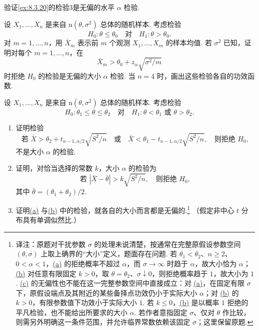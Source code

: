 \begin{exercise}\label{exercise:8.44}
验证\autoref{ex:8.3.20}的检验3是无偏的水平 $\alpha$ 检验.
\end{exercise}
\begin{exercise}\label{exercise:8.45}
设 $X_1,\ldots,X_n$ 是来自 $\mathrm n(\theta,\sigma^2)$ 总体的随机样本. 考虑检验
$$H_0:\theta\le\theta_0\quad\text{对}\quad H_1:\theta>\theta_0.$$
对 $m=1,\ldots,n$，用 $\bar X_m$ 表示前 $m$ 个观测 $X_1,\ldots,X_m$ 的样本均值. 若 $\sigma^2$ 已知，证明对每个 $m=1,\ldots,n$，在
$$\bar X_m>\theta_0+z_\alpha\sqrt{\sigma^2/m}$$
时拒绝 $H_0$ 的检验是无偏的大小 $\alpha$ 检验. 当 $n=4$ 时，画出这些检验各自的功效函数.
\end{exercise}
\begin{exercise}\label{exercise:8.46}
设 $X_1,\ldots,X_n$ 是来自 $\mathrm n(\theta,\sigma^2)$ 总体的随机样本. 考虑检验
$$H_0:\theta_1\le\theta\le\theta_2\quad\text{对}\quad H_1:\theta<\theta_1\text{ 或 }\theta>\theta_2.$$
\begin{enumerate}
\item{}\label{itm:exercise:8.46:a} 证明检验
$$\text{若 }\bar X>\theta_2+t_{n-1,\alpha/2}\sqrt{S^2/n}\quad\text{或}\quad
\bar X<\theta_1-t_{n-1,\alpha/2}\sqrt{S^2/n},\quad\text{则拒绝 }H_0,$$
不是大小 $\alpha$ 的检验.
\item{}\label{itm:exercise:8.46:b} 证明，对恰当选择的常数 $k$，大小 $\alpha$ 的检验为
$$\text{若 }|\bar X-\bar\theta|>k\sqrt{S^2/n},\quad\text{则拒绝 }H_0,$$
其中 $\bar\theta=(\theta_1+\theta_2)/2$.
\item{}\label{itm:exercise:8.46:c} 证明\hyperref[itm:exercise:8.46:a]{(a)} 与\hyperref[itm:exercise:8.46:b]{(b)} 中的检验，就各自的大小而言都是无偏的.\footnote{译注：原题对干扰参数 $\sigma$ 的处理未说清楚，按通常在完整原假设参数空间 $(\theta,\sigma)$ 上取上确界的“大小”定义，题面存在问题. 若 $\theta_1<\theta_2$、$n\ge2$、$0<\alpha<1$，\hyperref[itm:exercise:8.46:a]{(a)} 的拒绝概率不超过 $\alpha$，而 $\sigma\to\infty$ 时趋于 $\alpha$，故大小恰为 $\alpha$；\hyperref[itm:exercise:8.46:b]{(b)} 对任意有限固定 $k>0$，取 $\theta=\theta_2$、$\sigma\downarrow0$，则拒绝概率趋于 $1$，故大小为 $1$. \hyperref[itm:exercise:8.46:c]{(c)} 的无偏性也不能在这一完整参数空间中直接成立：对 \hyperref[itm:exercise:8.46:a]{(a)}，在固定有限 $\sigma$ 下，原假设端点及其附近的某些备择点功效仍小于实际大小 $\alpha$；对 \hyperref[itm:exercise:8.46:b]{(b)} 的 $k>0$，有限参数值下功效小于实际大小 $1$. 若 $k\le0$，\hyperref[itm:exercise:8.46:b]{(b)} 是以概率 $1$ 拒绝的平凡检验，也不能给出所要求的大小 $\alpha$. 若作者意指固定 $\sigma$、仅对 $\theta$ 作比较，则需另外明确这一条件范围，并允许临界常数依赖该固定 $\sigma$；这里保留原题.} （假定非中心 $t$ 分布具有单调似然比.）
\end{enumerate}

\end{exercise}
